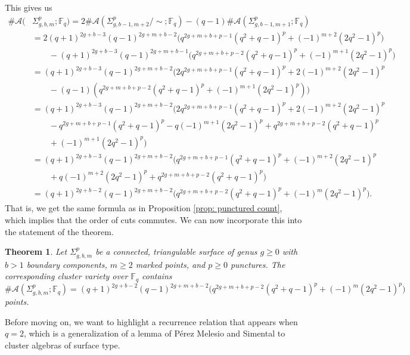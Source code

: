 \documentclass[reqno,12pt]{amsart}
\newtheorem{thm}{Theorem}[section]
\theoremstyle{definition}
\theoremstyle{remark}
\theoremstyle{remark}
\numberwithin{equation}{section}
\begin{document}
This gives us 
\begin{align*}
    \#\mathcal{A}(&\Sigma_{g,b,m}^p; \mathbb{F}_q) = 2\#\mathcal{A}(\Sigma_{g,b-1,m+2}^p/\sim; \mathbb{F}_q) - (q-1)\#\mathcal{A}(\Sigma_{g,b-1,m+1}^p; \mathbb{F}_q) \\
    &= 2(q+1)^{2g+b-3} (q-1)^{2g+m+b-2} \big( q^{2g+m+b+p-1} (q^2+q-1)^p + (-1)^{m+2} (2q^2-1)^p \big) \\ &\quad\quad - (q+1)^{2g+b-3} (q-1)^{2g+m+b-1} \big( q^{2g+m+b+p-2} (q^2+q-1)^p + (-1)^{m+1} (2q^2-1)^p \big) \\
    &= (q+1)^{2g+b-3} (q-1)^{2g+m+b-2} \big( 2q^{2g+m+b+p-1} (q^2+q-1)^p + 2(-1)^{m+2} (2q^2-1)^p  \\ &\quad\quad  - (q-1)(q^{2g+m+b+p-2} (q^2+q-1)^p + (-1)^{m+1} (2q^2-1)^p) \big) \\
    &= (q+1)^{2g+b-3} (q-1)^{2g+m+b-2} \big( 2q^{2g+m+b+p-1} (q^2+q-1)^p + 2(-1)^{m+2} (2q^2-1)^p  \\ &\quad\quad  - q^{2g+m+b+p-1} (q^2+q-1)^p - q(-1)^{m+1} (2q^2-1)^p + q^{2g+m+b+p-2} (q^2+q-1)^p  \\ &\quad\quad + (-1)^{m+1} (2q^2-1)^p \big) \\
    &= (q+1)^{2g+b-3} (q-1)^{2g+m+b-2} \big( q^{2g+m+b+p-1} (q^2+q-1)^p + (-1)^{m+2} (2q^2-1)^p  \\ &\quad\quad  + q(-1)^{m+2} (2q^2-1)^p + q^{2g+m+b+p-2} (q^2+q-1)^p \big) \\
    &= (q+1)^{2g+b-2} (q-1)^{2g+m+b-2} \big( q^{2g+m+b+p-2} (q^2+q-1)^p + (-1)^{m} (2q^2-1)^p \big).    
\end{align*}
That is, we get the same formula as in Proposition \ref{prop: punctured count}, which implies that the order of cuts commutes. We can now incorporate this into the statement of the theorem.

\begin{thm}\label{thm: punctured count full}
    Let $\Sigma_{g,b,m}^p$ be a connected, triangulable surface of genus $g \geq 0$ with $b>1$ boundary components, $m\geq 2$ marked points, and $p\geq 0$ punctures. 
	The corresponding cluster variety over $\mathbb{F}_q$ contains 
	\[ \#\mathcal{A}(\Sigma_{g,b,m}^p; \mathbb{F}_q) = (q+1)^{2g+b-2} (q-1)^{2g+m+b-2} \big( q^{2g+m+b+p-2} (q^2+q-1)^p + (-1)^m (2q^2-1)^p \big) \]
	points.
\end{thm}

Before moving on, we want to highlight a recurrence relation that appears when $q=2$, which is a generalization of a lemma of P{\'e}rez Melesio and Simental \cite[Lemma 1]{PMS26} to cluster algebras of surface type. 
\end{document}
